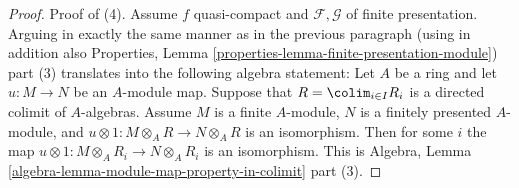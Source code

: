 \begin{proof}
\medskip\noindent
Proof of (4).
Assume $f$ quasi-compact and $\mathcal{F}, \mathcal{G}$ of finite presentation.
Arguing in exactly the same manner as in the previous paragraph
(using in addition also
Properties, Lemma \ref{properties-lemma-finite-presentation-module})
part (3) translates into the following algebra statement:
Let $A$ be a ring and let $u : M \to N$ be an $A$-module map.
Suppose that $R = \colim_{i \in I} R_i$ is a directed colimit
of $A$-algebras. Assume $M$ is a finite $A$-module, $N$ is a finitely
presented $A$-module, and
$u \otimes 1 : M \otimes_A R \to N \otimes_A R$ is an isomorphism.
Then for some $i$ the map
$u \otimes 1 : M \otimes_A R_i \to N \otimes_A R_i$ is an isomorphism.
This is
Algebra, Lemma \ref{algebra-lemma-module-map-property-in-colimit} part (3).
\end{proof}

